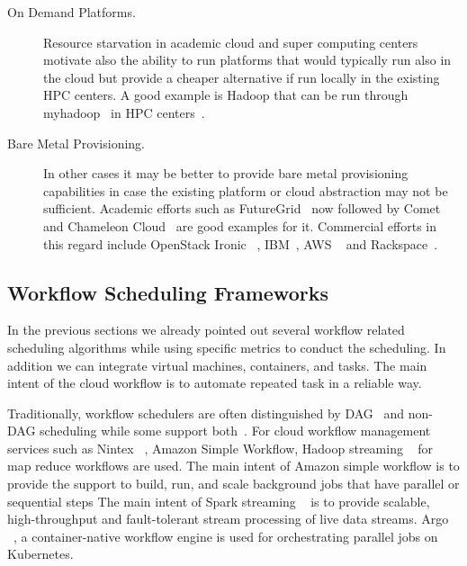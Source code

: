 \documentclass[final,5p,times,twocolumn]{elsarticle}
\begin{document}
\begin{description}
\item[On Demand Platforms.] Resource starvation in academic cloud and
  super computing centers motivate also the ability to run platforms
  that would typically run also in the cloud but provide a cheaper
  alternative if run locally in the existing HPC centers. A good
  example is Hadoop that can be run through
  myhadoop~\cite{krishnan2011myhadoop} in HPC centers~\cite{SDSC2019}.

\item[Bare Metal Provisioning.] In other cases it may be better to
  provide bare metal provisioning capabilities in case the
  existing platform or cloud abstraction may not be sufficient.
  Academic efforts such as FutureGrid~\cite{fox2013futuregrid} now
  followed by Comet~\cite{las-comet} and Chameleon Cloud~\cite{Chameleoncloud2019} 
  are good examples for it. Commercial
  efforts in this regard include OpenStack Ironic
 ~\cite{OpenstackIronic2019}, IBM~\cite{IBMBareMetal2019}, AWS
 ~\cite{AWS2019} and Rackspace~\cite{Rackspace2019}.

\end{description}







\subsection{Workflow Scheduling Frameworks} 
\label{sec:workflow}



In the previous sections we already pointed out several workflow
related scheduling algorithms while using specific metrics to conduct
the scheduling. In addition we can integrate virtual machines,
containers, and tasks. The main intent of the cloud workflow is to automate
repeated task in a reliable way. 


Traditionally, workflow schedulers are often distinguished by
DAG~\cite{deelman2005pegasus,deelman2004pegasus,thain2005distributed}
and non-DAG scheduling while some support
both~\cite{las-karajan,las-cogkit-1,las06-workflow-book}.
For cloud workflow management services such as
Nintex ~\cite{www-nintex-wf}, Amazon Simple Workflow,
Hadoop streaming ~\cite{www-hadoop-streaming} for
map reduce workflows are used. The main intent of Amazon
simple workflow is to provide the support to build,
run, and scale background jobs that have parallel or
sequential steps The main intent of Spark
streaming ~\cite{www-spark-streaming} is to provide scalable,
high-throughput and fault-tolerant
stream processing of live data streams. Argo ~\cite{www-argo-wf},
a container-native workflow
engine is used for orchestrating parallel jobs on Kubernetes.
\end{document}
